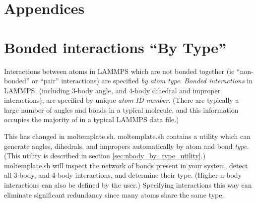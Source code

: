 \documentclass[11pt]{article}
\begin{document}

\pagebreak



\appendix
\section*{Appendices}

\section{Bonded interactions ``By Type''}
\label{sec:nbody_by_type}

Interactions between atoms in LAMMPS which are not bonded together
(ie ``non-bonded'' or ``pair'' interactions) 
are specified \textit{by atom type}.
\textit{Bonded interactions} in LAMMPS, 
(including 3-body angle, and 4-body dihedral and improper interactions),
are specified by unique \textit{atom ID number}.
(There are typically a large number of angles and bonds in 
a typical molecule, and this information occupies the 
majority of in a typical LAMMPS data file.)

This has changed in moltemplate.sh.  moltemplate.sh contains a 
utility which can generate angles, dihedrals, and impropers
automatically by atom and bond \textit{type}.
(This utility is described in section \ref{sec:nbody_by_type_utility}.)
moltemplate.sh will inspect the network of bonds present in your system, 
detect all 3-body, and 4-body interactions, and determine their type.
(Higher n-body interactions can also be defined by the user.)
Specifying interactions this way can eliminate significant redundancy 
since many atoms share the same type. 
\end{document}
